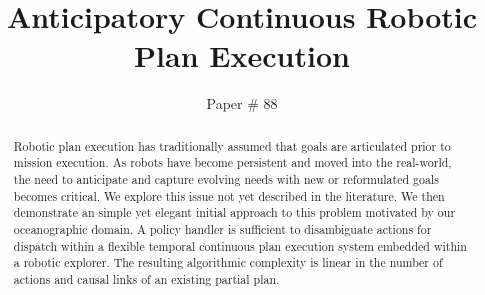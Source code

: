 \documentclass[letterpaper]{article}
\begin{document}
\title{Anticipatory Continuous Robotic Plan Execution}
\author{Paper \# 88}
\maketitle{}

\begin{abstract}

  Robotic plan execution has traditionally assumed that goals are
  articulated prior to mission execution. As robots have become
  persistent and moved into the real-world, the need to anticipate and
  capture evolving needs with new or reformulated goals becomes
  critical.  We explore this issue not yet described in the literature.
  We then demonstrate an simple yet elegant initial approach to this
  problem motivated by our oceanographic domain.  A policy handler
  is sufficient to disambiguate actions for dispatch
  within a flexible temporal continuous plan execution system embedded
  within a robotic explorer.  The resulting algorithmic complexity is
  linear in the number of actions and causal links of an existing
  partial plan.

\end{abstract}






 






\twocolumn 


\end{document}
